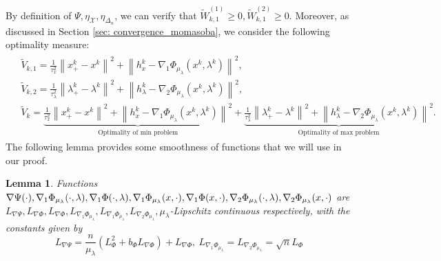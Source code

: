\documentclass[10pt]{article}
\newtheorem{lemma}{Lemma}[section]
\theoremstyle{remark}
\newcommand{\cX}{\mathcal{X}}
\newcommand{\norm}[1]{\left\|#1\right\|}
\begin{document}
By definition of $\Psi, \eta_{\cX}, \eta_{\Delta_n}$, we can verify that $\tilde W_{k,1}^{(1)}\geq 0, \tilde W_{k,1}^{(2)}\geq 0$. Moreover, as discussed in Section \ref{sec: convergence_momasoba}, we consider the following optimality measure:
\begin{align}\label{eq: V_k_momasoba}
    \begin{aligned}
    &\tilde V_{k,1} = \frac{1}{\tau_x^2}\norm{x_+^k - x^k}^2 + \norm{h_x^k - \nabla_1\Phi_{\mu_{\lambda}}(x^k,\lambda^k)}^2,\\
        &\tilde V_{k,2} = \frac{1}{\tau_{\lambda}^2}\norm{\lambda_+^k  - \lambda^k}^2 + \norm{h_{\lambda}^k - \nabla_2\Phi_{\mu_{\lambda}}(x^k, \lambda^k)}^2, \\
        &\tilde V_k = \underbrace{\frac{1}{\tau_x^2}\norm{x_+^k - x^k}^2 + \norm{h_x^k - \nabla_1\Phi_{\mu_{\lambda}}(x^k,\lambda^k)}^2}_{\text{Optimality of min problem}} + \underbrace{\frac{1}{\tau_{\lambda}^2}\norm{\lambda_+^k  - \lambda^k}^2 + \norm{h_{\lambda}^k - \nabla_2\Phi_{\mu_{\lambda}}(x^k, \lambda^k)}^2}_{\text{Optimality of max problem}}.
    \end{aligned}
\end{align}
The following lemma provides some smoothness of functions that we will use in our proof.
\begin{lemma}\label{lem: smoothness}
    Functions $\nabla\Psi(\cdot), \nabla_1\Phi_{\mu_{\lambda}}(\cdot, \lambda), \nabla_1\Phi(\cdot, \lambda), \nabla_1\Phi_{\mu_{\lambda}}(x,\cdot), \nabla_1\Phi(x,\cdot), \nabla_2\Phi_{\mu_{\lambda}}(\cdot, \lambda), \\ \nabla_2\Phi_{\mu_{\lambda}}(x, \cdot)$ are $L_{\nabla \Psi}, L_{\nabla\Phi}, L_{\nabla\Phi}, L_{\nabla_1\Phi_{\mu_{\lambda}}}, L_{\nabla_1\Phi_{\mu_{\lambda}}}, L_{\nabla_2\Phi_{\mu_{\lambda}}}, \mu_{\lambda}$-Lipschitz continuous respectively, with the constants given by
    \[
        L_{\nabla \Psi} = \frac{n}{\mu_{\lambda}}\left(L_{\Phi}^2 + b_{\Phi}L_{\nabla\Phi}\right) + L_{\nabla\Phi},\ L_{\nabla_1\Phi_{\mu_{\lambda}}} = L_{\nabla_2\Phi_{\mu_{\lambda}}} = \sqrt{n}L_{\Phi}
    \]
\end{lemma}
\end{document}

